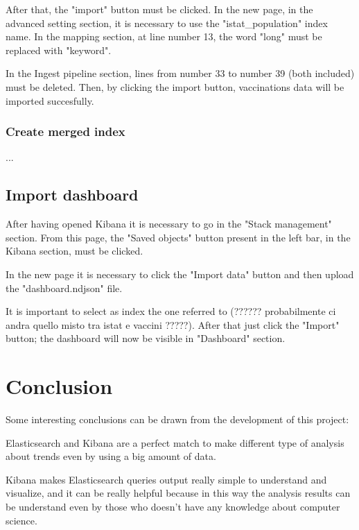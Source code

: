 \documentclass{article}
\begin{document}
After that, the {\selectfont"import"} button must be clicked. In the new page, in the advanced setting section, it is necessary to use the {\selectfont"istat\_population"} index name. In the mapping section, at line number 13, the word "long" must be replaced with "keyword".

In the Ingest pipeline section, lines from number 33 to number 39 (both included) must be deleted.
Then, by clicking the import button, vaccinations data will be imported succesfully.

\subsubsection{Create merged index}
...

\subsection{Import dashboard}
After having opened Kibana it is necessary to go in the {\selectfont"Stack management"} section. From this page, the {\selectfont"Saved objects"} button present in the left bar, in the Kibana section, must be clicked. 

In the new page it is necessary to click the {\selectfont"Import data"} button and then upload the {\selectfont"dashboard.ndjson"} file. 

It is important to select as index the one referred to (?????? probabilmente ci andra quello misto tra istat e vaccini ?????).
After that just click the {\selectfont"Import"} button; the dashboard will now be visible in {\selectfont"Dashboard"} section.

\newpage

\section{Conclusion}

Some interesting conclusions can be drawn from the development of this project:

Elasticsearch and Kibana are a perfect match to make different type of analysis about trends even by using a big amount of data.

Kibana makes Elasticsearch queries output really simple to understand and visualize, and it can be really helpful because in this way the analysis results can be understand even by those who doesn't have any knowledge about computer science.
\end{document}
